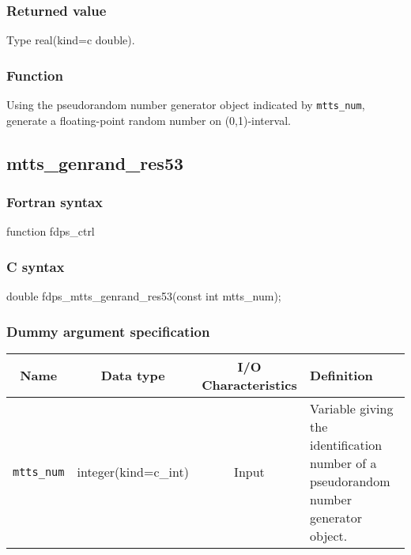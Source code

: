 \subsubsection*{Returned value}
Type real(kind=c double).

\subsubsection*{Function}
Using the pseudorandom number generator object indicated by \texttt{mtts\_num}, generate a floating-point random number on (0,1)-interval.
\clearpage

\subsection{mtts\_genrand\_res53}
\subsubsection*{Fortran syntax}
\begin{screen}
\begin{spverbatim}  
function fdps_ctrl%
\end{spverbatim}
\end{screen}

\subsubsection*{C syntax}
\begin{screen}
\begin{spverbatim}  
double fdps_mtts_genrand_res53(const int mtts_num);
\end{spverbatim}
\end{screen}

\subsubsection*{Dummy argument specification}
\begin{table}[h]
\begin{tabularx}{\linewidth}{cccX}
\toprule
\rowcolor{Snow2}
Name & Data type & I/O Characteristics & Definition \\
\midrule
\verb|mtts_num| & integer(kind=c\_int) & Input & Variable giving the identification number of a pseudorandom number generator object.\\
\bottomrule
\end{tabularx}
\end{table}


